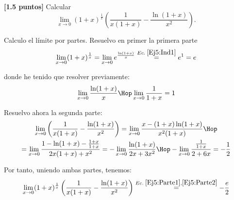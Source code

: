 \documentclass[12pt]{article}
\begin{document}
\begin{ejercicio} \textbf{[1.5 puntos]}
Calcular
\begin{equation*}
    \lim_{x\to 0} (1+x)^{\frac{1}{x}} \left( \frac{1}{x(1+x)} -\frac{\ln (1+x)}{x^2}\right).
\end{equation*}

Calculo el límite por partes. Resuelvo en primer la primera parte
\begin{equation} \label{Ej5:Parte1}
    \lim_{x\to 0} (1+x)^{\frac{1}{x}}
    = \lim_{x\to 0} e^{\frac{\ln (1+x)}{x}} \stackrel{Ec.\;\ref{Ej5:Ind1}}{=} e^1 = e
\end{equation}

donde he tenido que resolver previamente:
\begin{equation} \label{Ej5:Ind1}
    \lim_{x\to 0} \frac{\ln (1+x)}{x} \Hop \lim_{x\to 0} \frac{1}{1+x} = 1
\end{equation}

Resuelvo ahora la segunda parte:
\begin{multline} \label{Ej5:Parte2}
    \lim_{x\to 0} \left( \frac{1}{x(1+x)} -\frac{\ln (1+x)}{x^2}\right)
     = \lim_{x\to 0} \frac{x  -(1+x)\ln(1+x)}{x^2(1+x)}
     \Hop\\=
     \lim_{x\to 0} \frac{1  -\ln(1+x)-\frac{1+x}{1+x}}{2x(1+x)+x^2}
     =
      - \lim_{x\to 0} \frac{\ln(1+x)}{2x+3x^2}
      \Hop
      - \lim_{x\to 0} \frac{\frac{1}{1+x}}{2+6x} = -\frac{1}{2}
\end{multline}

Por tanto, uniendo ambas partes, tenemos:
\begin{equation*}
    \lim_{x\to 0} (1+x)^{\frac{1}{x}} \left( \frac{1}{x(1+x)} -\frac{\ln (1+x)}{x^2}\right) \stackrel{Ec.\;\ref{Ej5:Parte1},\ref{Ej5:Parte2}} =-\frac{e}{2}
\end{equation*}


\end{ejercicio}
\end{document}
